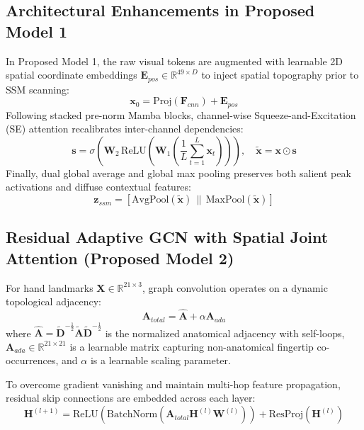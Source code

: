 \documentclass[journal]{IEEEtran}
\begin{document}
\subsection{Architectural Enhancements in Proposed Model 1}
In Proposed Model 1, the raw visual tokens are augmented with learnable 2D spatial coordinate embeddings $\mathbf{E}_{pos} \in \mathbb{R}^{49 \times D}$ to inject spatial topography prior to SSM scanning:
\begin{equation}
    \mathbf{x}_0 = \text{Proj}(\mathbf{F}_{cnn}) + \mathbf{E}_{pos}
\end{equation}
Following stacked pre-norm Mamba blocks, channel-wise Squeeze-and-Excitation (SE) attention recalibrates inter-channel dependencies:
\begin{equation}
    \mathbf{s} = \sigma\left(\mathbf{W}_2 \, \text{ReLU}\left(\mathbf{W}_1 \left(\frac{1}{L} \sum_{t=1}^L \mathbf{x}_t\right)\right)\right), \quad \tilde{\mathbf{x}} = \mathbf{x} \odot \mathbf{s}
\end{equation}
Finally, dual global average and global max pooling preserves both salient peak activations and diffuse contextual features:
\begin{equation}
    \mathbf{z}_{ssm} = \left[ \text{AvgPool}(\tilde{\mathbf{x}}) \,\|\, \text{MaxPool}(\tilde{\mathbf{x}}) \right]
\end{equation}

\subsection{Residual Adaptive GCN with Spatial Joint Attention (Proposed Model 2)}
For hand landmarks $\mathbf{X} \in \mathbb{R}^{21 \times 3}$, graph convolution operates on a dynamic topological adjacency:
\begin{equation}
    \mathbf{A}_{total} = \hat{\mathbf{A}} + \alpha \mathbf{A}_{ada}
\end{equation}
where $\hat{\mathbf{A}} = \tilde{\mathbf{D}}^{-\frac{1}{2}} \tilde{\mathbf{A}} \tilde{\mathbf{D}}^{-\frac{1}{2}}$ is the normalized anatomical adjacency with self-loops, $\mathbf{A}_{ada} \in \mathbb{R}^{21 \times 21}$ is a learnable matrix capturing non-anatomical fingertip co-occurrences, and $\alpha$ is a learnable scaling parameter. 

To overcome gradient vanishing and maintain multi-hop feature propagation, residual skip connections are embedded across each layer:
\begin{equation}
    \mathbf{H}^{(l+1)} = \text{ReLU}\left( \text{BatchNorm}\left( \mathbf{A}_{total} \mathbf{H}^{(l)} \mathbf{W}^{(l)} \right) \right) + \text{ResProj}\left(\mathbf{H}^{(l)}\right)
\end{equation}
\end{document}
